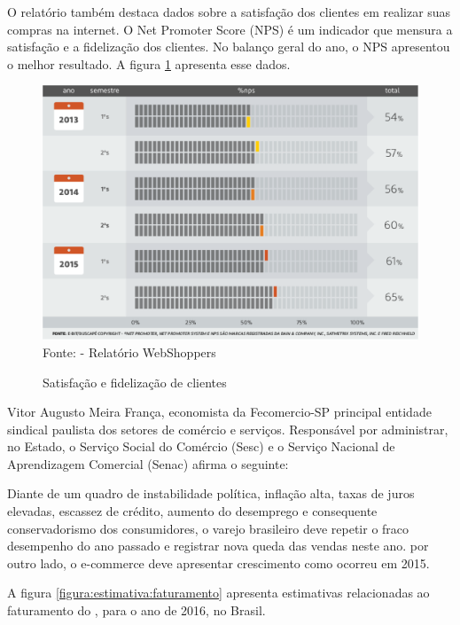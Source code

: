 \documentclass[a4paper,12pt]{monografia}
\begin{document}
O relatório também destaca dados sobre a satisfação dos clientes em realizar suas compras na internet. O Net Promoter Score (NPS) é um indicador que mensura a satisfação e a fidelização dos clientes. No balanço geral do ano, o NPS apresentou o melhor resultado. A figura \ref{figura:nps} apresenta esse dados.

\begin{figure}[H]
\centering
\caption{Satisfação e fidelização de clientes}
\centering
\includegraphics[width=12cm]{img/webshoppers/nps.eps}\\
\small{Fonte:  - Relatório WebShoppers}
\label{figura:nps}
\end{figure}

Vitor Augusto Meira França, economista da Fecomercio-SP principal entidade sindical paulista dos setores de comércio e serviços. Responsável por administrar, no Estado, o Serviço Social do Comércio (Sesc) e o Serviço Nacional de Aprendizagem Comercial (Senac) afirma o seguinte:

\begin{citacao}
Diante de um quadro de instabilidade política, inflação alta, taxas de juros elevadas, escassez de crédito, aumento do desemprego e consequente conservadorismo dos consumidores, o varejo brasileiro deve repetir o fraco desempenho do ano passado e registrar nova queda das vendas neste ano. por outro lado, o e-commerce deve apresentar crescimento como ocorreu em 2015. \cite{webshoppers}
\end{citacao}

A figura \ref{figura:estimativa:faturamento} apresenta estimativas relacionadas ao faturamento do , para o ano de 2016, no Brasil.
\end{document}

